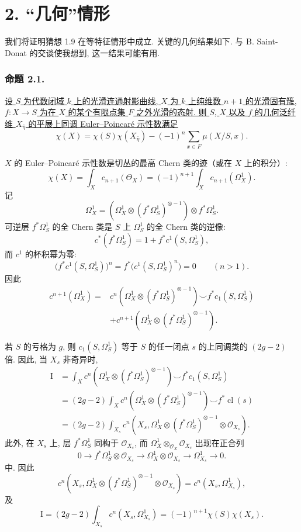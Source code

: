 \section*{2. “几何”情形}

我们将证明猜想 1.9 在等特征情形中成立. 关键的几何结果如下. 与 B. Saint-Donat 的交谈使我想到, 这一结果可能有用.

\subsubsection*{命题 2.1.}
\underline{设 $S$ 为代数闭域 $k$ 上的光滑连通射影曲线, $X$ 为 $k$ 上纯维数 $n+1$ 的光滑固有簇, $f:X\to S$ 为在 $X$ 的某个有限点集 $F$ 之外光滑的态射. 则 $S$, $X$ 以及 $f$ 的几何泛纤维 $X_{\bar\eta}$ 的平展上同调 Euler--Poincar\'e 示性数满足}
\begin{equation}\tag{2.1.1}
\chi(X)=\chi(S)\chi(X_{\bar\eta})
-(-1)^n\sum_{x\in F}\mu(X/S,x).
\end{equation}

$X$ 的 Euler--Poincar\'e 示性数是切丛的最高 Chern 类的迹（或在 $X$ 上的积分）:
\[
\chi(X)=\int_Xc_{n+1}(\Theta_X)
=(-1)^{n+1}\int_Xc_{n+1}(\Omega_X^1).
\]
记
\[
\Omega_X^1=\left(\Omega_X^1\otimes
(f^*\Omega_S^1)^{\otimes-1}\right)\otimes f^*\Omega_S^1.
\]
可逆层 $f^*\Omega_S^1$ 的全 Chern 类是 $S$ 上 $\Omega_S^1$ 的全 Chern 类的逆像:
\[
c^*(f^*\Omega_S^1)=1+f^*c^1(S,\Omega_S^1),
\]
而 $c^1$ 的杯积幂为零:
\[
\bigl(f^*c^1(S,\Omega_S^1)\bigr)^n
=f^*\bigl(c^1(S,\Omega_S^1)^n\bigr)=0
\qquad(n>1).
\]
因此
\begin{align*}
c^{n+1}(\Omega_X^1)
={}&c^n\!\left(\Omega_X^1\otimes
(f^*\Omega_S^1)^{\otimes-1}\right)
\smile f^*c_1(S,\Omega_S^1)\\
&+c^{n+1}\!\left(\Omega_X^1\otimes
(f^*\Omega_S^1)^{\otimes-1}\right).
\end{align*}

若 $S$ 的亏格为 $g$, 则 $c_1(S,\Omega_S^1)$ 等于 $S$ 的任一闭点 $s$ 的上同调类的 $(2g-2)$ 倍. 因此, 当 $X_s$ 非奇异时,
\begin{align*}
\mathrm I
&=\int_Xc^n\!\left(\Omega_X^1\otimes
(f^*\Omega_S^1)^{\otimes-1}\right)
\smile f^*c_1(S,\Omega_S^1)\\
&=(2g-2)\int_Xc^n\!\left(\Omega_X^1\otimes
(f^*\Omega_S^1)^{\otimes-1}\right)
\smile f^*\operatorname{cl}(s)\\
&=(2g-2)\int_{X_s}c^n\!\left(
X_s,\Omega_X^1\otimes(f^*\Omega_S^1)^{\otimes-1}
\otimes\mathcal O_{X_s}\right).
\end{align*}
此外, 在 $X_s$ 上, 层 $f^*\Omega_S^1$ 同构于 $\mathcal O_{X_s}$, 而 $\Omega_X^1\otimes_{\mathcal O_X}\mathcal O_{X_s}$ 出现在正合列
\[
0\longrightarrow f^*\Omega_S^1\otimes\mathcal O_{X_s}
\longrightarrow\Omega_X^1\otimes\mathcal O_{X_s}
\longrightarrow\Omega_{X_s}^1\longrightarrow0.
\]
中. 因此
\[
c^n\!\left(X_s,\Omega_X^1\otimes
(f^*\Omega_S^1)^{\otimes-1}\otimes\mathcal O_{X_s}\right)
=c^n(X_s,\Omega_{X_s}^1),
\]
及
\[
\mathrm I=(2g-2)\int_{X_s}c^n(X_s,\Omega_{X_s}^1)
=(-1)^{n+1}\chi(S)\chi(X_s).
\]

